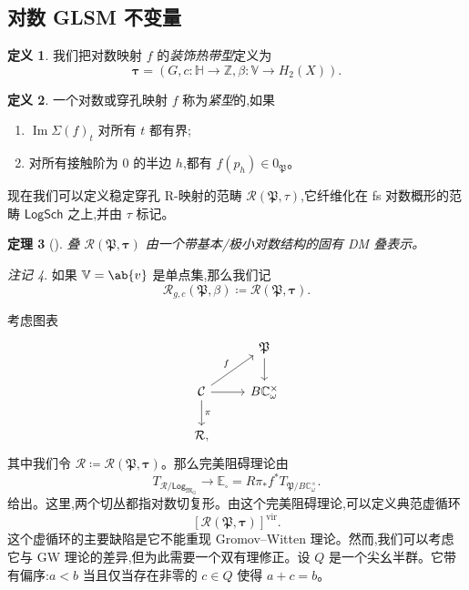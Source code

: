 \documentclass{amsart}
\newtheorem{thm}{定理}[section]
\theoremstyle{definition}
\newtheorem{defn}[thm]{定义}
\theoremstyle{remark}
\newtheorem{rmk}[thm]{注记}
\theoremstyle{plain}
\theoremstyle{definition}
\theoremstyle{remark}
\DeclareMathOperator{\Ima}{Im}
\newcommand{\C}{\mathbb{C}}
\newcommand{\Z}{\mathbb{Z}}
\newcommand{\E}{\mathbb{E}}
\newcommand{\V}{\mathbb{V}}
\renewcommand{\H}{\mathbb{H}}
\newcommand{\mc}[1]{\mathcal{#1}}
\newcommand{\mf}[1]{\mathfrak{#1}}
\newcommand{\mr}[1]{\mathrm{#1}}
\newcommand{\ms}[1]{\mathsf{#1}}
\newcommand{\1}{\mathbf{1}}
\newcommand{\2}{\mathbf{2}}
\newcommand{\3}{\mathbf{3}}
\newcommand{\vir}{\mr{vir}}
\begin{document}
\subsection{对数 GLSM 不变量}%
\label{sub:Log GLSM invariants}

\begin{defn}
    我们把对数映射 \(f\) 的\textit{装饰热带型}定义为
    \[ \bm{\tau} = (G, c \colon \H \to \Z, \beta \colon \V \to H_2(X)). \]
\end{defn}

\begin{defn}
    一个对数或穿孔映射 \(f\) 称为\textit{紧型}的,如果
    \begin{enumerate}
        \item \(\Ima \Sigma(f)_t\) 对所有 \(t\) 都有界;
        \item 对所有接触阶为 \(0\) 的半边 \(h\),都有 \(f(p_h) \in 0_{\mf{P}}\)。
    \end{enumerate}
\end{defn}

现在我们可以定义稳定穿孔 R-映射的范畴 \(\mc{R}(\mf{P}, \tau)\),它纤维化在 fs 对数概形的范畴 \(\ms{LogSch}\) 之上,并由 \(\tau\) 标记。

\begin{thm}[{\cite{CJR2021,CJRpunctured}}]
    叠 \(\mc{R}(\mf{P},\bm{\tau})\) 由一个带基本/极小对数结构的固有 DM 叠表示。
\end{thm}

\begin{rmk}
    如果 \(\V = \ab\{v\}\) 是单点集,那么我们记
    \[ \mc{R}_{g, c}(\mf{P}, \beta) \coloneqq \mc{R}(\mf{P}, \bm{\tau}). \]
\end{rmk}

考虑图表
\begin{equation*}
\begin{tikzcd}
    & \mf{P} \ar{d} \\
    \mc{C} \ar{ur}{f} \ar{d}{\pi} \ar{r} & B \C_{\omega}^{\times} \\
    \mc{R},
\end{tikzcd}
\end{equation*}
其中我们令 \(\mc{R} \coloneqq \mc{R}(\mf{P}, \bm{\tau})\)。那么完美阻碍理论由
\[ T_{\mc{R}/\ms{Log}_{\mf{M}_G}} \to \E_{\square} = R \pi_* f^* T_{\mf{P}/B\C_{\omega}^{\times}}. \]
给出。这里,两个切丛都指对数切复形。由这个完美阻碍理论,可以定义典范虚循环
\[ [\mc{R}(\mf{P}, \bm{\tau})]^{\vir}. \]
这个虚循环的主要缺陷是它不能重现 Gromov–Witten 理论。然而,我们可以考虑它与 GW 理论的差异,但为此需要一个双有理修正。设 \(Q\) 是一个尖幺半群。它带有偏序:\(a < b\) 当且仅当存在非零的 \(c \in Q\) 使得 \(a+c = b\)。
\end{document}
